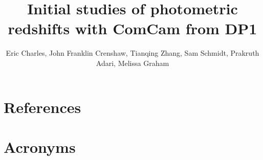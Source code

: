 \documentclass[SE,lsstdraft,authoryear,toc]{lsstdoc}
\title{Initial studies of photometric redshifts with ComCam from DP1}
\author{%
  Eric Charles,
  John Franklin Crenshaw,
  Tianqing Zhang, 
  Sam Schmidt,
  Prakruth Adari, 
  Melissa Graham
}
\date{\vcsDate}
\begin{document}
\maketitle


\appendix




\section{References} \label{sec:bib}
\renewcommand{\refname}{} %


\section{Acronyms} \label{sec:acronyms}

\end{document}

